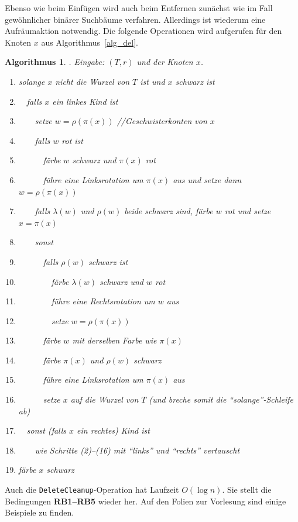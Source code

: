 \documentclass[10pt,reqno]{amsart}
\numberwithin{equation}{section}
\newtheorem{algorithm}[definition]{Algorithmus}
\begin{document}
Ebenso wie beim Einf\"ugen wird auch beim Entfernen zun\"achst wie im Fall gew\"ohnlicher bin\"arer Suchb\"aume verfahren.
Allerdings ist wiederum eine Aufr\"aumaktion notwendig. 
Die folgende Operationen wird aufgerufen f\"ur den Knoten $x$ aus Algorithmus~\ref{alg_del}.

\begin{algorithm}. {\em Eingabe:} $(T,r)$ und der Knoten $x$.
	\begin{enumerate}
		\item solange $x$ nicht die Wurzel von $T$ ist und $x$ schwarz ist
		\item $\quad$falls $x$ ein linkes Kind ist
		\item $\qquad$setze $w=\rho(\pi(x))$ \hfill//Geschwisterkonten von $x$
		\item $\qquad$falls $w$ rot ist
		\item $\quad\qquad$f\"arbe $w$ schwarz und $\pi(x)$ rot
		\item $\quad\qquad$f\"uhre eine Linksrotation um $\pi(x)$ aus und setze dann $w=\rho(\pi(x))$
		\item $\qquad$falls $\lambda(w)$ und $\rho(w)$ beide schwarz sind, f\"arbe $w$ rot und setze $x=\pi(x)$
		\item $\qquad$sonst
		\item $\quad\qquad$falls $\rho(w)$ schwarz ist
		\item $\qquad\qquad$f\"arbe $\lambda(w)$ schwarz und $w$ rot 
		\item $\qquad\qquad$f\"uhre eine Rechtsrotation um $w$ aus
		\item $\qquad\qquad$setze $w=\rho(\pi(x))$
		\item $\quad\qquad$f\"arbe $w$ mit derselben Farbe wie $\pi(x)$
		\item $\quad\qquad$f\"arbe $\pi(x)$ und $\rho(w)$ schwarz
		\item $\quad\qquad$f\"uhre eine Linksrotation um $\pi(x)$ aus
		\item $\quad\qquad$setze $x$ auf die Wurzel von $T$ (und breche somit die ``solange''-Schleife ab)
		\item $\quad$sonst (falls $x$ ein rechtes) Kind ist
		\item $\qquad${\em wie Schritte (2)--(16) mit ``links'' und ``rechts'' vertauscht}
		\item f\"arbe $x$ schwarz
	\end{enumerate}
\end{algorithm}

Auch die {\tt DeleteCleanup}-Operation hat Laufzeit $O(\log n)$.
Sie stellt die Bedingungen {\bf RB1--RB5} wieder her.
Auf den Folien zur Vorlesung sind einige Beispiele zu finden.
\end{document}
